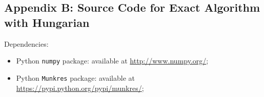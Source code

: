\documentclass{article} %
\begin{document}
\vspace{\fill}
\pagebreak
\subsection*{Appendix B: Source Code for Exact Algorithm with Hungarian}

\par Dependencies:
\begin{itemize}
    \item Python \texttt{numpy} package: available at \url{http://www.numpy.org/};
    \item Python \texttt{Munkres} package: available at \url{https://pypi.python.org/pypi/munkres/};
\end{itemize}


\end{document}
